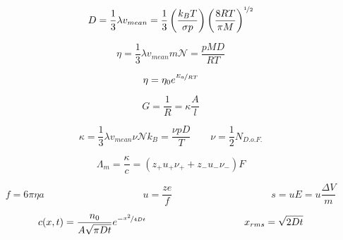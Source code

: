 \documentclass[12pt, letterpaper]{memoir}
\begin{document}
\noindent
\begin{minipage}[t]{0.5\linewidth}
	\begin{equation*}
		D=\frac{1}{3}\lambda v_{mean}=\frac{1}{3}\left(\frac{k_BT}{\sigma p}\right)\left(\frac{8RT}{\pi M}\right)^{\nicefrac{1}{2}}
	\end{equation*}
\end{minipage}
\begin{minipage}[t]{0.5\linewidth}
	\begin{equation*}
		\eta = \frac{1}{3}\lambda v_{mean}m\mathcal{N}=\frac{pMD}{RT}
	\end{equation*}
\end{minipage}

\noindent
\begin{minipage}[t]{0.5\linewidth}
	\begin{equation*}
		\eta=\eta_0e^{\nicefrac{E_a}{RT}}
	\end{equation*}

	\begin{equation*}
		G=\frac{1}{R}=\kappa\frac{A}{l}
	\end{equation*}
\end{minipage}
\begin{minipage}[t]{0.5\linewidth}
	\begin{equation*}
		\kappa = \frac{1}{3} \lambda v_{mean}\nu\mathcal{N}k_B =  \frac{\nu pD}{T} \hspace{2em} \nu=\frac{1}{2}N_{D.o.F.}
	\end{equation*}

	\begin{equation*}
		\Lambda_m = \frac{\kappa}{c}=\left(z_+u_+\nu_++z_-u_-\nu_-\right)F
	\end{equation*}
\end{minipage}

\begin{equation*}
	f=6\pi\eta a \hspace{10em} u = \frac{ze}{f} \hspace{10em} s=uE=u\frac{\Delta V}{m}
\end{equation*}

\begin{equation*}
	c(x,t)=\frac{n_0}{A\sqrt{\pi Dt}}e^{-\nicefrac{x^2}{4Dt}} \hspace{10em} x_{rms}=\sqrt{2Dt}
\end{equation*}
\end{document}
